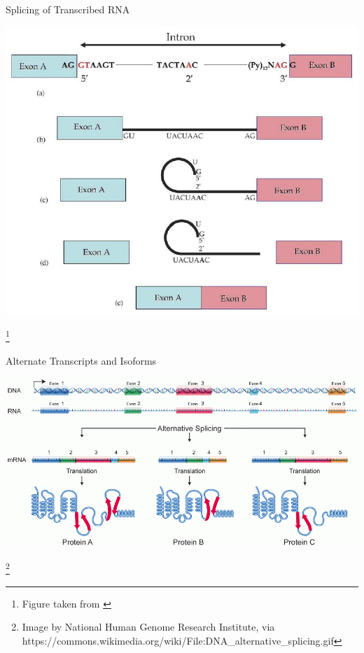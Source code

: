 \documentclass[aspectratio=169,11pt]{beamer}
\newcommand\blfootnote[1]{%
  \begingroup
  \renewcommand\thefootnote{}\footnote{#1}%
  \addtocounter{footnote}{-1}%
  \endgroup
}
\begin{document}
\begin{frame}{Splicing of Transcribed RNA}

	\begin{center}
	\includegraphics[scale=0.5]{figures/splicing.jpg} 
	\end{center}

	\blfootnote{Figure taken from \cite{pmid16054339}}

\end{frame}


\begin{frame}{Alternate Transcripts and Isoforms}

	\begin{center}
	\includegraphics[scale=0.28]{figures/DNA_alternative_splicing.png} 
	\end{center}

	\blfootnote{Image by National Human Genome Research Institute, via https://commons.wikimedia.org/wiki/File:DNA\_alternative\_splicing.gif}

\end{frame}
\end{document}
